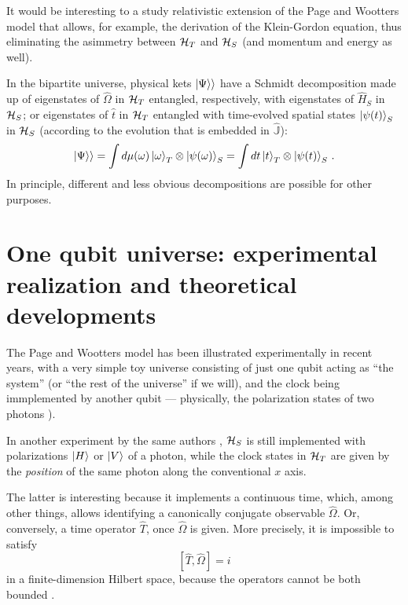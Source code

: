 It would be interesting to a study relativistic extension of the
Page and Wootters model that allows, for example, the derivation of the Klein-Gordon
equation, thus eliminating the asimmetry between
$\mathcal{H}_T$ and $\mathcal{H}_S$ (and momentum and energy as well).

In the bipartite universe, physical kets $|\Psi\rangle\rangle$ have a Schmidt decomposition
made up of
eigenstates of $\hat{\Omega}$ in $\mathcal{H}_T$
entangled, respectively, with
eigenstates of $\hat{H}_S$ in $\mathcal{H}_S$;
or eigenstates of $\hat{t}$ in $\mathcal{H}_T$
entangled with time-evolved spatial states $\ket{\psi(t)}_S$ in $\mathcal{H}_S$
(according to the evolution that is embedded in $\hat{\mathbb{J}}$):
\begin{equation}
  |\Psi\rangle\rangle = \int d\mu(\omega) \ket{\omega}_{T}\otimes\ket{\psi(\omega)}_{S} = \int dt \ket{t}_{T} \otimes \ket{\psi(t)}_{S}\,\text{.} 
\end{equation}
In principle, different and less obvious decompositions are possible for other purposes.

\section[
  One qubit universe \dots
]{One qubit universe: experimental realization and theoretical developments}

The Page and Wootters model has been illustrated experimentally in recent years,
with a very simple toy universe consisting of just one qubit acting as ``the system'' (or
``the rest of the universe'' if we will), and the clock being immplemented by another qubit ---
physically, the polarization states of two photons \parencite{Moreva:synthetic,Moreva:illustration}).

In another experiment by the same authors \parencite{Moreva_position}, $\mathcal{H}_S$ is still implemented with 
polarizations $\ket{H}$ or $\ket{V}$ of a photon, while the clock states in $\mathcal{H}_T$
are given by the \emph{position} of the same photon along the conventional $x$ axis.

The latter is interesting because it implements a continuous time,
which, among other things, allows identifying a canonically conjugate observable
$\hat{\Omega}$. Or, conversely, a time operator $\hat{T}$, once $\hat{\Omega}$ is given.
More precisely, it is impossible to satisfy
\begin{equation}\label{eq:canonical_commutation_in_time}
  [\hat{T}, \hat{\Omega}] = i
\end{equation}
in a finite-dimension Hilbert space, because the operators
cannot be both bounded \parencite{Weyl1927}.

